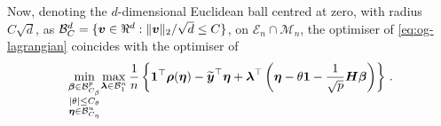 \documentclass{article}
\makeatletter
\theoremstyle{definition}
\newcommand{\vnorm}[1]{%
	\ensuremath{%
		\if@display
		\left\| #1 \right\|
		\else
		\| #1 \|
		\fi
	}%
}
\newcommand{\abs}[1]{%
	\ensuremath{%
		\if@display
		\left| #1 \right|
		\else
		\lvert #1 \rvert
		\fi
	}%
}
\newcommand*{\bb}{\boldsymbol}
\newcommand{\etady}{\ensuremath{\hat{\bb{\eta}}^{\textrm{\tiny DY}}}}
\def\bv{\bb{v}}
\def\bYtil{\widetilde{\bb{y}}}
\def\bbeta{\bb{\beta}}
\def\blambda{\bb{\lambda}}
\makeatother
\begin{document}
\begin{bibunit}
Now, denoting the $d$-dimensional Euclidean ball centred at zero, with radius $C \sqrt{d}$, as
$\mathcal{B}^d_C = \{\bv \in \Re^d: \vnorm{\bv}_2 / \sqrt{d} \leq C \}$, on $\mathcal E_n \cap \mathcal M_n$, the optimiser of
\eqref{eq:og-lagrangian} coincides with the optimiser of
\begin{equation}
    \label{eq:lagrangian2}
    \underset{\substack{\bbeta \in \mathcal{B}^p_{C_\beta} \\ \abs{\theta} \leq C_\theta \\ \bb{\eta} \in \mathcal{B}^n_{C_\eta}}}{\min} \underset{\blambda \in \mathcal{B}^n_1}{\max} \,  \frac{1}{n} \left\{\bb{1}^\top \bb{\rho}(\bb{\eta})-  \bYtil^\top \bb{\eta}+ \bb{\lambda}^\top \left(\bb{\eta} - \theta \bb{1} - \frac{1}{\sqrt{p}} \bb{H} \bbeta \right) \right\} \,.
\end{equation}


\end{bibunit}
\end{document}
